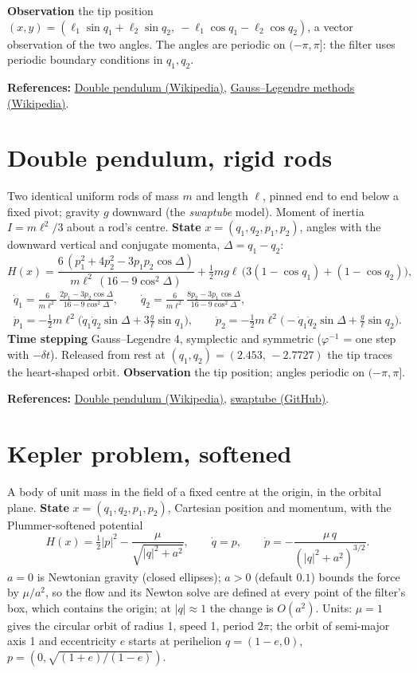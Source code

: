 \documentclass[11pt,a4paper]{article}
\newcommand{\modelsection}[2]{\clearpage\hypertarget{#1}{}\section{#2}\label{model:#1}}
\begin{document}
\textbf{Observation} the tip position $(x,y)=(\ell_1\sin q_1+\ell_2\sin q_2,\ -\ell_1\cos q_1-\ell_2\cos q_2)$, a vector observation of the two angles. The angles are periodic on $(-\pi,\pi]$: the filter uses periodic boundary conditions in $q_1,q_2$.

\textbf{References:} \href{https://en.wikipedia.org/wiki/Double_pendulum}{Double pendulum (Wikipedia)}, \href{https://en.wikipedia.org/wiki/Gauss\%E2\%80\%93Legendre_method}{Gauss--Legendre methods (Wikipedia)}.

\modelsection{pendulum_rod}{Double pendulum, rigid rods}
Two identical uniform rods of mass $m$ and length $\ell$, pinned end to end below a fixed pivot; gravity $g$ downward (the \emph{swaptube} model). Moment of inertia $I=m\ell^2/3$ about a rod's centre. \textbf{State} $x=(q_1,q_2,p_1,p_2)$, angles with the downward vertical and conjugate momenta, $\Delta=q_1-q_2$:
\[
  H(x)=\frac{6\,(p_1^2+4p_2^2-3p_1p_2\cos\Delta)}{m\ell^2\,(16-9\cos^2\Delta)}+\tfrac12 mg\ell\,\big(3(1-\cos q_1)+(1-\cos q_2)\big),
\]
\begin{gather*}
  \dot q_1=\frac{6}{m\ell^2}\,\frac{2p_1-3p_2\cos\Delta}{16-9\cos^2\Delta}, \qquad
  \dot q_2=\frac{6}{m\ell^2}\,\frac{8p_2-3p_1\cos\Delta}{16-9\cos^2\Delta}, \\
  \dot p_1=-\tfrac12 m\ell^2\big(\dot q_1\dot q_2\sin\Delta+3\tfrac g\ell\sin q_1\big), \qquad
  \dot p_2=-\tfrac12 m\ell^2\big(-\dot q_1\dot q_2\sin\Delta+\tfrac g\ell\sin q_2\big).
\end{gather*}
\textbf{Time stepping} Gauss--Legendre 4, symplectic and symmetric ($\varphi^{-1}$ = one step with $-\delta t$). Released from rest at $(q_1,q_2)=(2.453,\,-2.7727)$ the tip traces the heart-shaped orbit. \textbf{Observation} the tip position; angles periodic on $(-\pi,\pi]$.

\textbf{References:} \href{https://en.wikipedia.org/wiki/Double_pendulum}{Double pendulum (Wikipedia)}, \href{https://github.com/2swap/swaptube}{swaptube (GitHub)}.

\modelsection{kepler}{Kepler problem, softened}
A body of unit mass in the field of a fixed centre at the origin, in the orbital plane. \textbf{State} $x=(q_1,q_2,p_1,p_2)$, Cartesian position and momentum, with the Plummer-softened potential
\[
  H(x)=\tfrac12|p|^2-\frac{\mu}{\sqrt{|q|^2+a^2}}, \qquad \dot q=p, \qquad \dot p=-\frac{\mu\,q}{(|q|^2+a^2)^{3/2}} .
\]
$a=0$ is Newtonian gravity (closed ellipses); $a>0$ (default $0.1$) bounds the force by $\mu/a^2$, so the flow and its Newton solve are defined at every point of the filter's box, which contains the origin; at $|q|\approx1$ the change is $O(a^2)$. Units: $\mu=1$ gives the circular orbit of radius 1, speed 1, period $2\pi$; the orbit of semi-major axis 1 and eccentricity $e$ starts at perihelion $q=(1-e,0)$, $p=(0,\sqrt{(1+e)/(1-e)})$.
\end{document}
